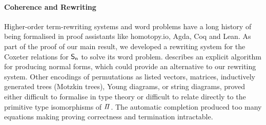 
\paragraph{Coherence and Rewriting}

Higher-order term-rewriting systems and word problems have a long history of being formalised in proof assistants like
    {homotopy.io}, Agda, Coq and Lean. As part of the proof of our main
result, we developed a rewriting system for the Coxeter relations for $\Sn$ to solve its word problem.
\citet{hiverCoqCombiCoxeterPresentation2021} describes an explicit algorithm for producing normal forms, which could
provide an alternative to our rewriting system. Other encodings of permutations as listed vectors, matrices, inductively
generated trees (Motzkin trees), Young diagrams, or string diagrams, proved either difficult to formalise in type theory
or difficult to relate directly to the primitive type isomorphisms of $\mathit{\Pi}$. The automatic
\citet{knuthSimpleWordProblems1970} completion produced too many equations making proving correctness and termination
intractable.

